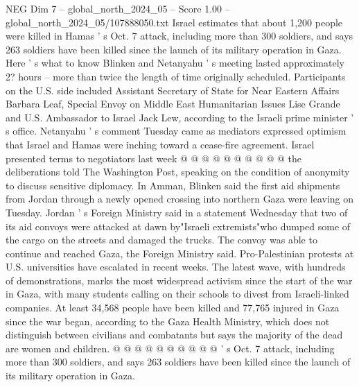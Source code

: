 \begin{textsample}{NEG Dim 7 – global\_north\_2024\_05 – Score 1.00 – global\_north\_2024\_05/107888050.txt}
Israel estimates that about 1,200 people were killed in Hamas ' s Oct. 7 attack, including more than 300 soldiers, and says 263 soldiers have been killed since the launch of its military operation in Gaza.
Here ' s what to know Blinken and Netanyahu ' s meeting lasted approximately 2? hours -- more than twice the length of time originally scheduled.
Participants on the U.S. side included Assistant Secretary of State for Near Eastern Affairs Barbara Leaf, Special Envoy on Middle East Humanitarian Issues Lise Grande and U.S.
Ambassador to Israel Jack Lew, according to the Israeli prime minister ' s office.
Netanyahu ' s comment Tuesday came as mediators expressed optimism that Israel and Hamas were inching toward a cease-fire agreement.
Israel presented terms to negotiators last week @ @ @ @ @ @ @ @ @ @ the deliberations told The Washington Post, speaking on the condition of anonymity to discuss sensitive diplomacy.
In Amman, Blinken said the first aid shipments from Jordan through a newly opened crossing into northern Gaza were leaving on Tuesday.
Jordan ' s Foreign Ministry said in a statement Wednesday that two of its aid convoys were attacked at dawn by"Israeli extremists"who dumped some of the cargo on the streets and damaged the trucks.
The convoy was able to continue and reached Gaza, the Foreign Ministry said.
Pro-Palestinian protests at U.S. universities have escalated in recent weeks.
The latest wave, with hundreds of demonstrations, marks the most widespread activism since the start of the war in Gaza, with many students calling on their schools to divest from Israeli-linked companies.
At least 34,568 people have been killed and 77,765 injured in Gaza since the war began, according to the Gaza Health Ministry, which does not distinguish between civilians and combatants but says the majority of the dead are women and children. @ @ @ @ @ @ @ @ @ @ ' s Oct. 7 attack, including more than 300 soldiers, and says 263 soldiers have been killed since the launch of its military operation in Gaza.

\end{textsample}
